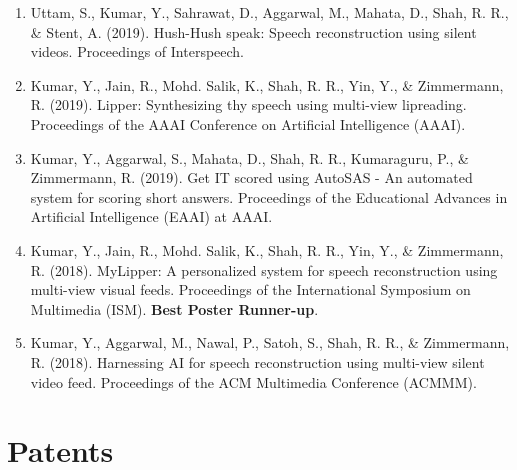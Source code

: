 \begin{enumerate}
    \item Uttam, S., Kumar, Y., Sahrawat, D., Aggarwal, M., Mahata, D., Shah, R. R., \& Stent, A. (2019). Hush-Hush speak: Speech reconstruction using silent videos. Proceedings of Interspeech.

    \item Kumar, Y., Jain, R., Mohd. Salik, K., Shah, R. R., Yin, Y., \& Zimmermann, R. (2019). Lipper: Synthesizing thy speech using multi-view lipreading. Proceedings of the AAAI Conference on Artificial Intelligence (AAAI).

    \item Kumar, Y., Aggarwal, S., Mahata, D., Shah, R. R., Kumaraguru, P., \& Zimmermann, R. (2019). Get IT scored using AutoSAS - An automated system for scoring short answers. Proceedings of the Educational Advances in Artificial Intelligence (EAAI) at AAAI.

    \item Kumar, Y., Jain, R., Mohd. Salik, K., Shah, R. R., Yin, Y., \& Zimmermann, R. (2018). MyLipper: A personalized system for speech reconstruction using multi-view visual feeds. Proceedings of the International Symposium on Multimedia (ISM). \textbf{Best Poster Runner-up}.

    \item Kumar, Y., Aggarwal, M., Nawal, P., Satoh, S., Shah, R. R., \& Zimmermann, R. (2018). Harnessing AI for speech reconstruction using multi-view silent video feed. Proceedings of the ACM Multimedia Conference (ACMMM).
\end{enumerate}



\chapter*{Patents}

